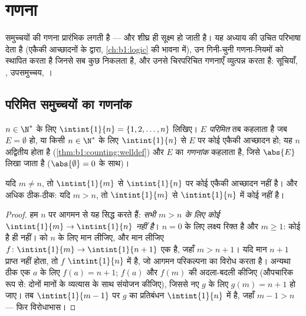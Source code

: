 \chapter{गणना}\label{ch:b1:counting}

 समुच्चयों की गणना प्रारंभिक लगती है --- और शीघ्र ही सूक्ष्म हो जाती
है। यह अध्याय  की उचित परिभाषा देता है (एकैकी आच्छादनों के द्वारा,
\cref{ch:b1:logic} की भावना में), उन गिनी-चुनी गणना-नियमों को स्थापित करता
है जिनसे सब कुछ निकलता है, और उनसे चिरपरिचित गणनाएँ व्युत्पन्न करता है:
सूचियाँ, , उपसमुच्चय, ।

\section{परिमित समुच्चयों का गणनांक}

\begin{definition}[परिमित समुच्चय, गणनांक]\label{def:b1:counting:card}
$n \in \N^*$ के लिए $\intint{1}{n} = \{1, 2, \dots, n\}$ लिखिए।  $E$
\emph{परिमित} तब कहलाता है जब $E = \emptyset$ हो, या
किसी $n \in \N^*$ के लिए $\intint{1}{n}$ से $E$ पर कोई एकैकी आच्छादन हो; यह
$n$ अद्वितीय होता है (\cref{thm:b1:counting:welldef}) और $E$ का
\emph{गणनांक} कहलाता है, जिसे $\abs{E}$ लिखा जाता है
($\abs{\emptyset} = 0$ के साथ)।
\end{definition}

\begin{theorem}[गणनांक सुपरिभाषित है]\label{thm:b1:counting:welldef}
यदि $m \neq n$, तो $\intint{1}{m}$ से $\intint{1}{n}$ पर कोई एकैकी आच्छादन
नहीं है। और अधिक ठीक-ठीक: यदि $m > n$, तो $\intint{1}{m}$ से $\intint{1}{n}$
में कोई   नहीं है।
\end{theorem}

\begin{proof}
हम $n$ पर आगमन से यह  सिद्ध करते हैं: \emph{सभी $m > n$ के लिए कोई 
 $\intint{1}{m} \to \intint{1}{n}$ नहीं है}। $n = 0$ के लिए
लक्ष्य रिक्त है और $m \geq 1$: कोई  है ही नहीं।  को $n$ के लिए
मान लीजिए, और मान लीजिए $f \colon \intint{1}{m} \to \intint{1}{n+1}$ एक
  है, जहाँ $m > n + 1$। यदि मान $n + 1$ प्राप्त नहीं होता,
तो $f$ $\intint{1}{n}$ में   है, जो आगमन परिकल्पना का विरोध
करता है। अन्यथा ठीक एक $a$ के लिए $f(a) = n + 1$; $f(a)$ और $f(m)$ की
अदला-बदली कीजिए (औपचारिक रूप से: दोनों मानों के व्यत्यास के साथ संयोजन
कीजिए), जिससे नए   $g$ के लिए $g(m) = n + 1$ हो जाए। तब
$\intint{1}{m-1}$ पर $g$ का प्रतिबंधन $\intint{1}{n}$ में  
है, जहाँ $m - 1 > n$ --- फिर विरोधाभास।
\end{proof}

